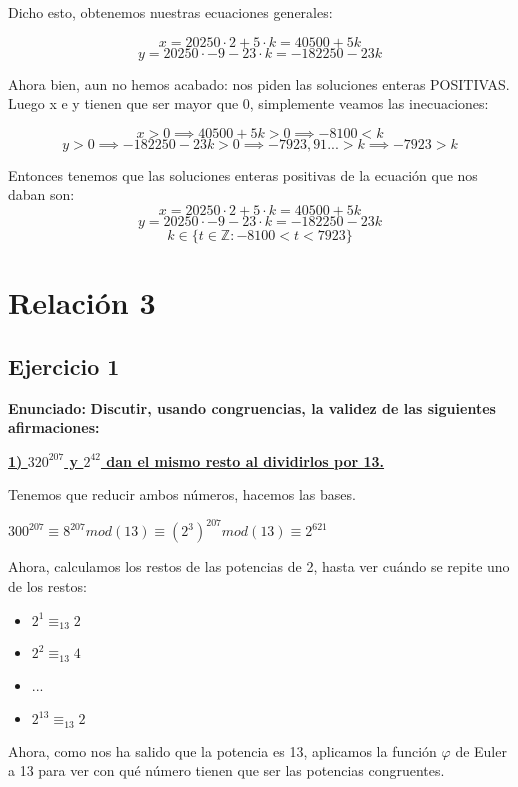 \documentclass[11pt, a4paper, titlepage]{article}
\begin{document}
Dicho esto, obtenemos nuestras ecuaciones generales:

$$ x = 20250 \cdot 2 + 5 \cdot k = 40500 + 5k $$
$$ y = 20250 \cdot -9 - 23 \cdot k = -182250 - 23k $$

Ahora bien, aun no hemos acabado: nos piden las soluciones enteras POSITIVAS. Luego x e y tienen que ser mayor que 0, simplemente veamos las inecuaciones:

$$ x > 0 \implies 40500 + 5k > 0 \implies -8100 < k$$
$$ y > 0 \implies -182250 - 23k > 0 \implies -7923,91... > k \implies -7923 > k $$

Entonces tenemos que las soluciones enteras positivas de la ecuación que nos daban son:
$$ x = 20250 \cdot 2 + 5 \cdot k = 40500 + 5k $$
$$ y = 20250 \cdot -9 - 23 \cdot k = -182250 - 23k $$
$$ k \in \{ t \in \mathbb{Z} : -8100 < t < 7923 \} $$





\pagebreak
\section{\Huge{Relación 3}}

\subsection{\LARGE{Ejercicio 1}}

\textbf{Enunciado:}\textbf{ Discutir, usando congruencias, la validez de las siguientes afirmaciones:}

\underline{\textbf{1) $320^{207}$ y $2^{42}$ dan el mismo resto al dividirlos por 13.}}

Tenemos que reducir ambos números, hacemos las bases.

$300^{207}\equiv 8^{207}mod(13) \equiv (2^3)^{207} mod(13) \equiv 2^{621}$

Ahora, calculamos los restos de las potencias de 2, hasta ver cuándo se repite uno de los restos:

\begin{itemize}
	\item $2^1 \equiv_{13} 2$
	\item $2^2 \equiv_{13} 4$
	\item ...
	\item $2^{13} \equiv_{13} 2$
\end{itemize}

Ahora, como nos ha salido que la potencia es 13, aplicamos la función $\varphi$ de Euler a 13 para ver con qué número tienen que ser las potencias congruentes.
\end{document}
